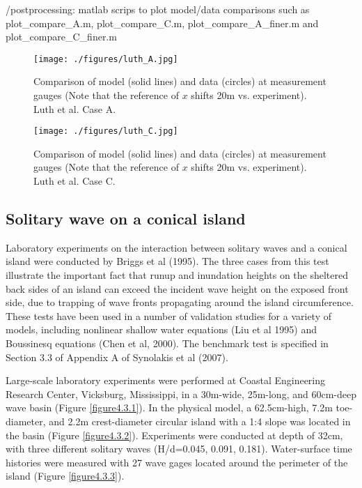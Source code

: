 \documentclass[11pt]{article}
\begin{document}
/postprocessing: matlab scrips to plot model/data comparisons such as plot\_compare\_A.m, plot\_compare\_C.m, plot\_compare\_A\_finer.m and plot\_compare\_C\_finer.m

 \begin{figure}[htbp]
\centering
\texttt{[image: ./figures/luth\_A.jpg]}
\caption{Comparison of model (solid lines) and data (circles) at measurement gauges (Note that the reference of $x$ shifts 20m vs. experiment). Luth et al. Case A.}
\label{luth_A}
\end{figure}

 \begin{figure}[htbp]
\centering
\texttt{[image: ./figures/luth\_C.jpg]}
\caption{Comparison of model (solid lines) and data (circles) at measurement gauges (Note that the reference of $x$ shifts 20m vs. experiment). Luth et al. Case C.}
\label{luth_C}
\end{figure}

\subsection{Solitary wave on a conical island}

Laboratory experiments on the interaction between solitary waves and a conical island were conducted by Briggs et al (1995).  The three cases from this test illustrate the important fact that runup and inundation heights on the sheltered back sides of an island can exceed the incident wave height on the exposed front side, due to trapping of wave fronts propagating around the island circumference.  These tests have been used in a number of validation studies for a variety of models, including nonlinear shallow water equations (Liu et al 1995) and Boussinesq equations (Chen et al, 2000).   The benchmark test is specified in Section 3.3 of Appendix A of Synolakis et al (2007).

Large-scale laboratory experiments were performed at Coastal Engineering Research Center, Vicksburg, Mississippi, in a 30m-wide, 25m-long, and 60cm-deep wave basin (Figure {\ref{figure4.3.1}}).  In the physical model, a 62.5cm-high, 7.2m toe-diameter, and 2.2m crest-diameter circular island with a 1:4 slope was located in the basin (Figure  {\ref{figure4.3.2}}). Experiments were conducted at depth of 32cm, with three different solitary waves (H/d=0.045, 0.091, 0.181). Water-surface time histories were measured with 27 wave gages located around the perimeter of the island (Figure {\ref{figure4.3.3}}).
\end{document}
